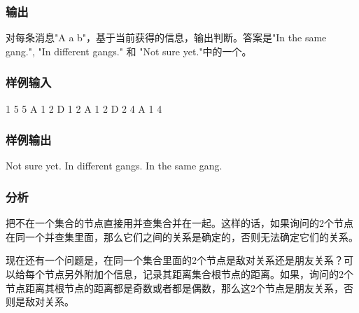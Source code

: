 \subsubsection{输出}
对每条消息"A a b"，基于当前获得的信息，输出判断。答案是"In the same gang.", "In different gangs." 和 "Not sure yet."中的一个。

\subsubsection{样例输入}
\begin{Code}
1
5 5
A 1 2
D 1 2
A 1 2
D 2 4
A 1 4
\end{Code}

\subsubsection{样例输出}
\begin{Code}
Not sure yet.
In different gangs.
In the same gang.
\end{Code}

\subsubsection{分析}
把不在一个集合的节点直接用并查集合并在一起。这样的话，如果询问的2个节点在同一个并查集里面，那么它们之间的关系是确定的，否则无法确定它们的关系。

现在还有一个问题是，在同一个集合里面的2个节点是敌对关系还是朋友关系？可以给每个节点另外附加个信息，记录其距离集合根节点的距离。如果，询问的2个节点距离其根节点的距离都是奇数或者都是偶数，那么这2个节点是朋友关系，否则是敌对关系。

